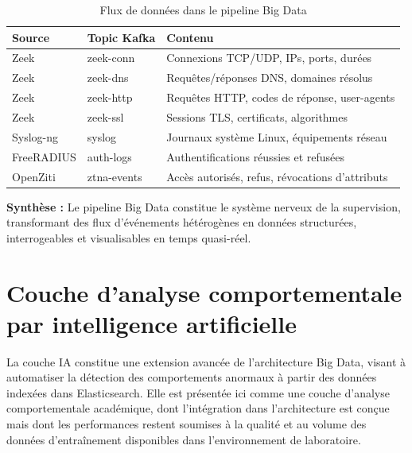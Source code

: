 \documentclass[12pt,a4paper,oneside]{report}
\begin{document}
	\begin{table}[H]
		\centering
		\caption{Flux de données dans le pipeline Big Data}
		\renewcommand{\arraystretch}{1.4}
		\begin{tabularx}{\textwidth}{|l|l|X|}
			\hline
			\textbf{Source} & \textbf{Topic Kafka} & \textbf{Contenu} \\
			\hline
			Zeek & zeek-conn & Connexions TCP/UDP, IPs, ports, durées \\
			\hline
			Zeek & zeek-dns & Requêtes/réponses DNS, domaines résolus \\
			\hline
			Zeek & zeek-http & Requêtes HTTP, codes de réponse, user-agents \\
			\hline
			Zeek & zeek-ssl & Sessions TLS, certificats, algorithmes \\
			\hline
			Syslog-ng & syslog & Journaux système Linux, équipements réseau \\
			\hline
			FreeRADIUS & auth-logs & Authentifications réussies et refusées \\
			\hline
			OpenZiti & ztna-events & Accès autorisés, refus, révocations d'attributs \\
			\hline
		\end{tabularx}
	\end{table}
	
	\begin{mdframed}[linecolor=black,roundcorner=4pt,innertopmargin=8pt,innerbottommargin=8pt]
		\textbf{Synthèse :} Le pipeline Big Data constitue le système nerveux de la
		supervision, transformant des flux d'événements hétérogènes en données
		structurées, interrogeables et visualisables en temps quasi-réel.
	\end{mdframed}
	
	\section{Couche d'analyse comportementale par intelligence artificielle}
	
	La couche IA constitue une extension avancée de l'architecture Big Data,
	visant à automatiser la détection des comportements anormaux à partir des
	données indexées dans Elasticsearch. Elle est présentée ici comme une couche
	d'analyse comportementale académique, dont l'intégration dans l'architecture
	est conçue mais dont les performances restent soumises à la qualité et
	au volume des données d'entraînement disponibles dans l'environnement de
	laboratoire.
	
\end{document}

